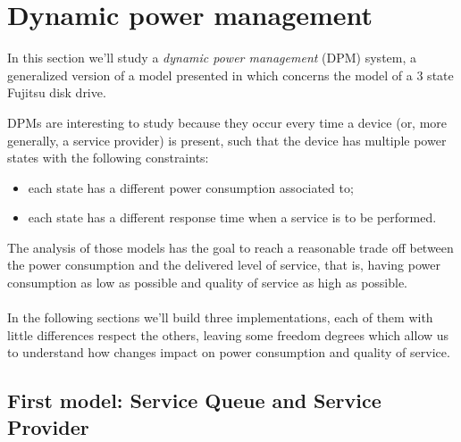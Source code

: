 \section{Dynamic power management}

In this section we'll study a \emph{dynamic power management} (DPM)
system, a generalized version of a model presented in \cite{QWP99}
which concerns the model of a 3 state Fujitsu disk drive.

DPMs are interesting to study because they occur every time a device
(or, more generally, a service provider) is present, such that the
device has multiple power states with the following constraints:
\begin{itemize}
\item each state has a different power consumption associated to;
\item each state has a different response time when a service is to be
  performed.
\end{itemize}
The analysis of those models has the goal to reach a reasonable
trade off between the power consumption and the delivered level of
service, that is, having power consumption as low as possible and
quality of service as high as possible.
\\\\
In the following sections we'll build three implementations, each of
them with little differences respect the others, leaving some freedom
degrees which allow us to understand how changes impact on power
consumption and quality of service.

\subsection{First model: Service Queue and Service Provider}

